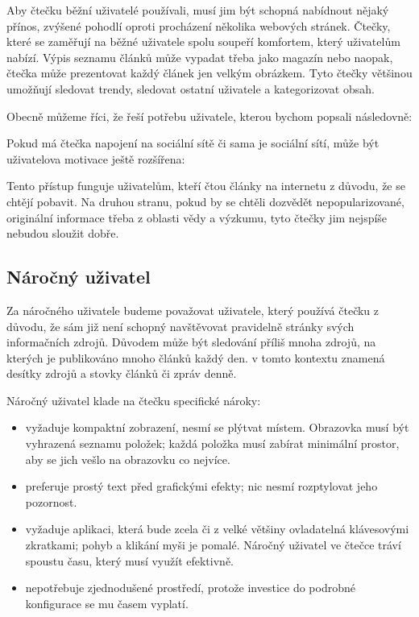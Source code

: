 Aby čtečku běžní uživatelé používali, musí jim být schopná nabídnout nějaký přínos, zvýšené pohodlí oproti procházení několika webových stránek.
Čtečky, které se zaměřují na běžné uživatele spolu soupeří komfortem, který uživatelům nabízí.
Výpis seznamu článků může vypadat třeba jako magazín nebo naopak, čtečka může prezentovat každý článek jen velkým obrázkem.
Tyto čtečky většinou umožňují sledovat trendy, sledovat ostatní uživatele a kategorizovat obsah.

Obecně můžeme říci, že řeší potřebu uživatele, kterou bychom popsali následovně:

Pokud má čtečka napojení na sociální sítě či sama je sociální sítí, může být uživatelova motivace ještě rozšířena:

Tento přístup funguje uživatelům, kteří čtou články na internetu z důvodu, že se chtějí pobavit.
Na druhou stranu, pokud by se chtěli dozvědět nepopularizované, originální informace třeba z oblasti vědy a výzkumu, tyto čtečky jim nejspíše nebudou sloužit dobře.

\subsection{Náročný uživatel}\label{ssec:narocny-uzivatel}

Za náročného uživatele budeme považovat uživatele, který používá čtečku z důvodu, že sám již není schopný navštěvovat pravidelně stránky svých informačních zdrojů.
Důvodem může být sledování příliš mnoha zdrojů, na kterých je publikováno mnoho článků každý den.
 v tomto kontextu znamená desítky zdrojů a stovky článků či zpráv denně.

Náročný uživatel klade na čtečku specifické nároky:
\begin{itemize}
    \item vyžaduje kompaktní zobrazení, nesmí se plýtvat místem.
        Obrazovka musí být vyhrazená seznamu položek; každá položka musí zabírat minimální prostor, aby se jich vešlo na obrazovku co nejvíce.
    \item preferuje prostý text před grafickými efekty; nic nesmí rozptylovat jeho pozornost.
    \item vyžaduje aplikaci, která bude zcela či z velké většiny ovladatelná klávesovými zkratkami; pohyb a klikání myši je pomalé.
        Náročný uživatel ve čtečce tráví spoustu času, který musí využít efektivně.
    \item nepotřebuje zjednodušené prostředí, protože investice do podrobné konfigurace se mu časem vyplatí.
\end{itemize}

